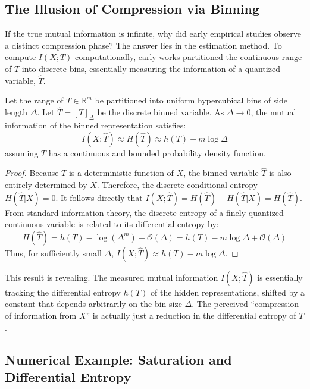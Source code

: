 \subsection{The Illusion of Compression via Binning}

If the true mutual information is infinite, why did early empirical studies observe a distinct compression phase? The answer lies in the estimation method. To compute $I(X; T)$ computationally, early works partitioned the continuous range of $T$ into discrete bins, essentially measuring the information of a quantized variable, $\hat{T}$.

\begin{theorem}
Let the range of $T \in \mathbb{R}^m$ be partitioned into uniform hypercubical bins of side length $\Delta$. Let $\hat{T} = [T]_\Delta$ be the discrete binned variable. As $\Delta \to 0$, the mutual information of the binned representation satisfies:
\[
I(X; \hat{T}) \approx H(\hat{T}) \approx h(T) - m \log \Delta
\]
assuming $T$ has a continuous and bounded probability density function.
\end{theorem}

\begin{proof}
Because $T$ is a deterministic function of $X$, the binned variable $\hat{T}$ is also entirely determined by $X$. Therefore, the discrete conditional entropy $H(\hat{T} | X) = 0$. 
It follows directly that $I(X; \hat{T}) = H(\hat{T}) - H(\hat{T} | X) = H(\hat{T})$.
From standard information theory, the discrete entropy of a finely quantized continuous variable is related to its differential entropy by:
\[
H(\hat{T}) = h(T) - \log(\Delta^m) + \mathcal{O}(\Delta) = h(T) - m \log \Delta + \mathcal{O}(\Delta)
\]
Thus, for sufficiently small $\Delta$, $I(X; \hat{T}) \approx h(T) - m \log \Delta$.
\end{proof}

This result is revealing. The measured mutual information $I(X; \hat{T})$ is essentially tracking the differential entropy $h(T)$ of the hidden representations, shifted by a constant that depends arbitrarily on the bin size $\Delta$. The perceived ``compression of information from $X$'' is actually just a reduction in the differential entropy of $T$.

\subsection{Numerical Example: Saturation and Differential Entropy}

